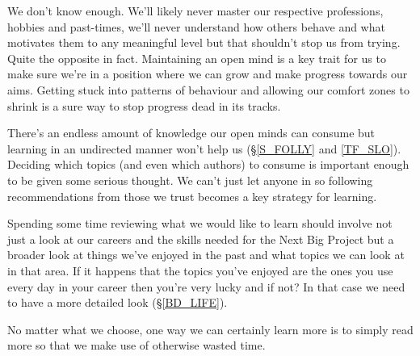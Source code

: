 \cleardoublepage
{\small

We don't know enough. We'll likely never master our respective professions, hobbies and past-times, we'll never understand how others behave and what motivates them to any meaningful level but that shouldn't stop us from trying. Quite the opposite in fact. Maintaining an open mind is a key trait for us to make sure we're in a position where we can grow and make progress towards our aims. Getting stuck into patterns of behaviour and allowing our comfort zones to shrink is a sure way to stop progress dead in its tracks.

There's an endless amount of knowledge our open minds can consume but learning in an undirected manner won't help us (\S \ref{S_FOLLY} and \ref{TF_SLO}). 
Deciding which topics (and even which authors) to consume is important enough to be given some serious thought. We can't just let anyone in so following recommendations from those we trust becomes a key strategy for learning.

Spending some time reviewing what we would like to learn should involve not just a look at our careers and the skills needed for the Next Big Project but a broader look at things we've enjoyed in the past and what topics we can look at in that area. If it happens that the topics you've enjoyed are the ones you use every day in your career then you're very lucky and if not? In that case we need to have a more detailed look (\S \ref{BD_LIFE}).

No matter what we choose, one way we can certainly learn more is to simply read more so that we make use of otherwise wasted time. 

}
